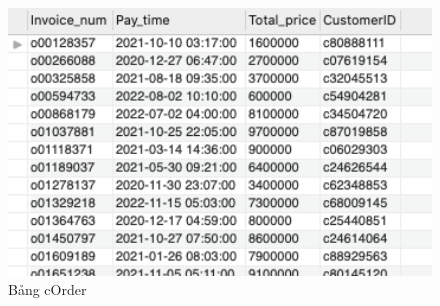 \begin{figure}[H]
    \centering
    \includegraphics[width=12cm]{images/ORDER.png}
    \caption{Bảng cOrder}
\end{figure}

